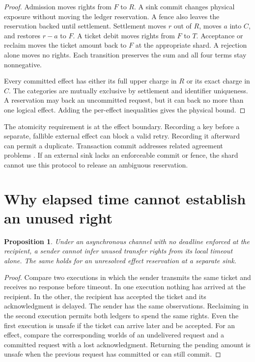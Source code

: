 \documentclass[11pt]{article}
\newtheorem{proposition}{Proposition}
\begin{document}
\begin{proof}
Admission moves rights from $F$ to $R$. A sink commit changes
physical exposure without moving the ledger reservation. A fence
also leaves the reservation backed until settlement. Settlement
moves $r$ out of $R$, moves $a$ into $C$, and restores $r-a$
to $F$. A ticket debit moves rights from $F$ to $T$.
Acceptance or reclaim moves the ticket amount back to $F$
at the appropriate shard. A rejection alone moves no rights.
Each transition preserves the sum and all four terms stay
nonnegative.

Every committed effect has either its full upper charge in
$R$ or its exact charge in $C$. The categories are mutually
exclusive by settlement and identifier uniqueness. A reservation
may back an uncommitted request, but it can back no more than
one logical effect. Adding the per-effect inequalities gives
the physical bound.
\end{proof}

The atomicity requirement is at the effect boundary. Recording a
key before a separate, fallible external effect can block a valid
retry. Recording it afterward can permit a duplicate. Transaction
commit addresses related agreement problems \cite{gray}. If an
external sink lacks an enforceable commit or fence, the shard
cannot use this protocol to release an ambiguous reservation.

\section{Why elapsed time cannot establish an unused right}
\begin{proposition}
Under an asynchronous channel with no deadline enforced at the
recipient, a sender cannot infer unused transfer rights from its
local timeout alone. The same holds for an unresolved effect
reservation at a separate sink.
\end{proposition}
\begin{proof}
Compare two executions in which the sender transmits the same
ticket and receives no response before timeout. In one execution
nothing has arrived at the recipient. In the other, the recipient
has accepted the ticket and its acknowledgment is delayed.
The sender has the same observations. Reclaiming in the second
execution permits both ledgers to spend the same rights. Even
the first execution is unsafe if the ticket can arrive later
and be accepted. For an effect, compare the corresponding worlds
of an undelivered request and a committed request with a lost
acknowledgment. Returning the pending amount is unsafe when the
previous request has committed or can still commit.
\end{proof}
\end{document}
